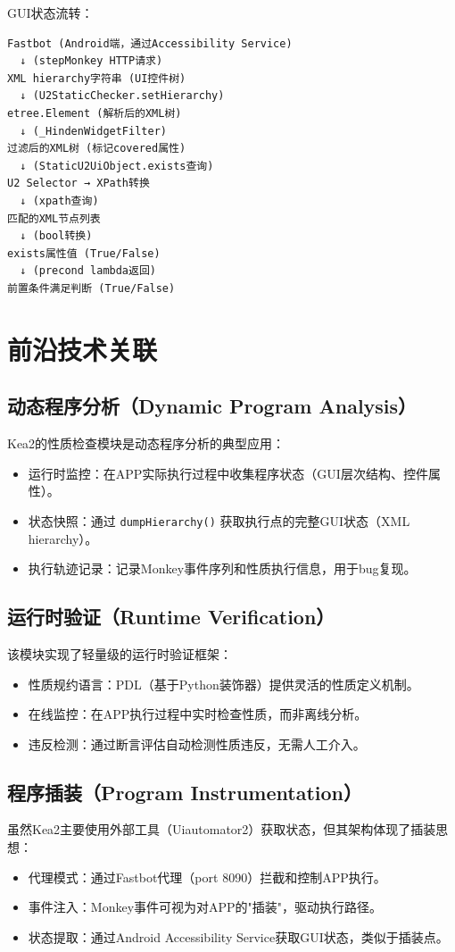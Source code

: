 \documentclass[a4paper, zihao=-4]{ctexart}
\newcommand{\bff}[1]{{\heiti #1}}
\begin{document}
\bff{GUI状态流转}：
\begin{Verbatim}[fontsize=\footnotesize]
Fastbot (Android端，通过Accessibility Service)
  ↓ (stepMonkey HTTP请求)
XML hierarchy字符串 (UI控件树)
  ↓ (U2StaticChecker.setHierarchy)
etree.Element (解析后的XML树)
  ↓ (_HindenWidgetFilter)
过滤后的XML树 (标记covered属性)
  ↓ (StaticU2UiObject.exists查询)
U2 Selector → XPath转换
  ↓ (xpath查询)
匹配的XML节点列表
  ↓ (bool转换)
exists属性值 (True/False)
  ↓ (precond lambda返回)
前置条件满足判断 (True/False)
\end{Verbatim}

\section{前沿技术关联}

\subsection{动态程序分析（Dynamic Program Analysis）}
Kea2的性质检查模块是动态程序分析的典型应用：
\begin{itemize}
    \item \bff{运行时监控}：在APP实际执行过程中收集程序状态（GUI层次结构、控件属性）。
    \item \bff{状态快照}：通过 \texttt{dumpHierarchy()} 获取执行点的完整GUI状态（XML hierarchy）。
    \item \bff{执行轨迹记录}：记录Monkey事件序列和性质执行信息，用于bug复现。
\end{itemize}

\subsection{运行时验证（Runtime Verification）}
该模块实现了轻量级的运行时验证框架：
\begin{itemize}
    \item \bff{性质规约语言}：PDL（基于Python装饰器）提供灵活的性质定义机制。
    \item \bff{在线监控}：在APP执行过程中实时检查性质，而非离线分析。
    \item \bff{违反检测}：通过断言评估自动检测性质违反，无需人工介入。
\end{itemize}

\subsection{程序插装（Program Instrumentation）}
虽然Kea2主要使用外部工具（Uiautomator2）获取状态，但其架构体现了插装思想：
\begin{itemize}
    \item \bff{代理模式}：通过Fastbot代理（port 8090）拦截和控制APP执行。
    \item \bff{事件注入}：Monkey事件可视为对APP的"插装"，驱动执行路径。
    \item \bff{状态提取}：通过Android Accessibility Service获取GUI状态，类似于插装点。
\end{itemize}
\end{document}
